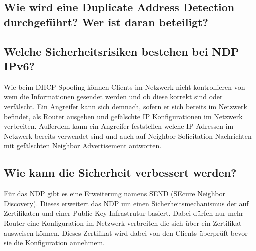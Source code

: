 \documentclass[a4paper,12pt]{article} %
\begin{document}
\subsection{Wie wird eine Duplicate Address Detection durchgeführt? Wer ist daran beteiligt?}

\subsection{Welche Sicherheitsrisiken bestehen bei NDP IPv6?}
Wie beim DHCP-Spoofing können Clients im Netzwerk nicht kontrollieren von wem die Informationen gesendet werden und ob diese korrekt sind oder verfälscht. Ein Angreifer kann sich demnach, sofern er sich bereits im Netzwerk befindet, als Router ausgeben und gefälschte IP Konfigurationen im Netzwerk verbreiten. 
Außerdem kann ein Angreifer feststellen welche IP Adressen im Netzwerk bereits verwendet sind und auch auf Neighbor Solicitation Nachrichten mit gefälschten Neighbor Advertisement antworten.

\subsection{Wie kann die Sicherheit verbessert werden? }
Für das NDP gibt es eine Erweiterung namens SEND (SEcure Neighbor Discovery). Dieses erweitert das NDP um einen Sicherheitsmechanismus der auf Zertifikaten und einer Public-Key-Infrastrutur basiert. Dabei dürfen nur mehr Router eine Konfiguration im Netzwerk verbreiten die sich über ein Zertifikat ausweisen können. Dieses Zertifikat wird dabei von den Clients überprüft bevor sie die Konfiguration annehmem.  

\newpage
\begin{appendix}
\end{appendix}

\newpage
{}
{}
\listoffigures


{}
{}
\lstlistoflistings

%
%

\end{document}
